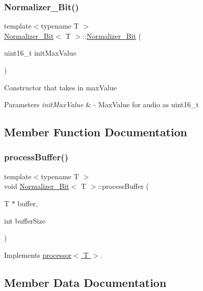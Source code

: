 \subsubsection{\texorpdfstring{Normalizer\+\_\+Bit()}{Normalizer\_16Bit()}}
{\footnotesize\ttfamily template$<$typename T $>$ \\
\hyperlink{classNormalizer__16Bit}{Normalizer\+\_\+Bit}$<$ T $>$\+::\hyperlink{classNormalizer__16Bit}{Normalizer\+\_\+Bit} (\begin{DoxyParamCaption}\item[{uint16\+\_\+t}]{init\+Max\+Value }\end{DoxyParamCaption})}

Constructor that takes in max\+Value 
\begin{DoxyParams}{Parameters}
{\em init\+Max\+Value} & -\/ Max\+Value for audio as uint16\+\_\+t \\
\hline
\end{DoxyParams}


\subsection{Member Function Documentation}
\mbox{\label{classNormalizer__16Bit_aa1f13f72888abe2929716c4fe56cdf41}} 
\subsubsection{\texorpdfstring{process\+Buffer()}{processBuffer()}}
{\footnotesize\ttfamily template$<$typename T $>$ \\
void \hyperlink{classNormalizer__16Bit}{Normalizer\+\_\+Bit}$<$ T $>$\+::process\+Buffer (\begin{DoxyParamCaption}\item[{T $\ast$}]{buffer,  }\item[{int}]{buffer\+Size }\end{DoxyParamCaption})\hspace{0.3cm}{\ttfamily [virtual]}}



Implements \hyperlink{classprocessor_ab23d53c7dd927e50108272ee007dcc29}{processor$<$ T $>$}.



\subsection{Member Data Documentation}
\mbox{\label{classNormalizer__16Bit_aecbd608e002ccf5af89306bc9add3667}} 
